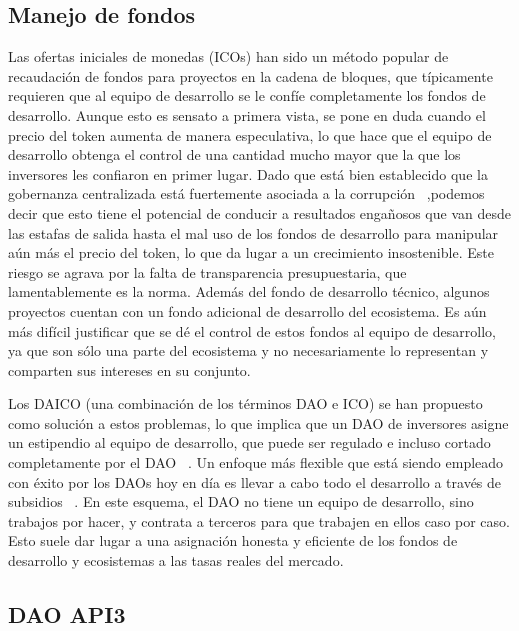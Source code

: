 \documentclass[11pt]{article}
\begin{document}
\subsection{Manejo de fondos}
\label{sec:management-of-funds}

Las ofertas iniciales de monedas (ICOs) han sido un método popular de recaudación de fondos para proyectos en la cadena de bloques, que típicamente requieren que al equipo de desarrollo se le confíe completamente los fondos de desarrollo. Aunque esto es sensato a primera vista, se pone en duda cuando el precio del token aumenta de manera especulativa, lo que hace que el equipo de desarrollo obtenga el control de una cantidad mucho mayor que la que los inversores les confiaron en primer lugar. Dado que está bien establecido que la gobernanza centralizada está fuertemente asociada a la corrupción ~\cite{fisman:2002},podemos decir que esto tiene el potencial de conducir a resultados engañosos que van desde las estafas de salida hasta el mal uso de los fondos de desarrollo para manipular aún más el precio del token, lo que da lugar a un crecimiento insostenible. Este riesgo se agrava por la falta de transparencia presupuestaria, que lamentablemente es la norma. Además del fondo de desarrollo técnico, algunos proyectos cuentan con un fondo adicional de desarrollo del ecosistema. Es aún más difícil justificar que se dé el control de estos fondos al equipo de desarrollo, ya que son sólo una parte del ecosistema y no necesariamente lo representan y comparten sus intereses en su conjunto.

Los DAICO (una combinación de los términos DAO e ICO) se han propuesto como solución a estos problemas, lo que implica que un DAO de inversores asigne un estipendio al equipo de desarrollo, que puede ser regulado e incluso cortado completamente por el DAO ~\cite{buterin:2018}.
Un enfoque más flexible que está siendo empleado con éxito por los DAOs hoy en día es llevar a cabo todo el desarrollo a través de subsidios ~\cite{dxdao:2019}.
En este esquema, el DAO no tiene un equipo de desarrollo, sino trabajos por hacer, y contrata a terceros para que trabajen en ellos caso por caso. Esto suele dar lugar a una asignación honesta y eficiente de los fondos de desarrollo y ecosistemas a las tasas reales del mercado.

\subsection{DAO API3}
\label{sec:api3-dao}
\end{document}
